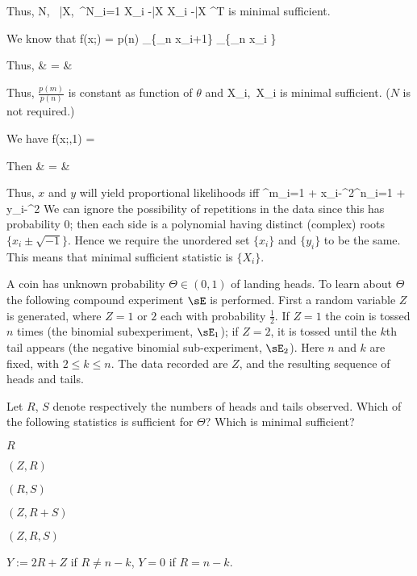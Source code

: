 Thus,
\be
\lob N, \ \bar{X},\ \sum^N_{i=1} \lob X_i -\bar{X} \rob \lob X_i -\bar{X} \rob^T\rob
\ee
is minimal sufficient.

\item [(c)] We know that
\be
f(x;\theta) = p(n) _{\{\max_n x_i\leq \theta+1\}} _{\{\min_n x_i \geq \theta\}}
\ee

Thus,
\beast
{} & = & \\
\eeast

Thus, $\frac{p(m)}{p(n)}$ is constant as function of $\theta$ and
\be
\lob \min X_i,\ \max X_i\rob
\ee
is minimal sufficient. ($N$ is not required.)

\item [(d)] We have
\be
f(x;\theta,1) = 
\ee

Then
\beast
{} & = & 
\eeast

Thus, $x$ and $y$ will yield proportional likelihoods iff
\be
\prod^m_{i=1} + \lob x_i-\theta\rob^2\rob \propto \prod^n_{i=1} + \lob y_i-\theta\rob^2\rob
\ee
We can ignore the possibility of repetitions in the data since this has probability 0; then each side is a polynomial having distinct (complex) roots $\{x_i\pm \sqrt{-1}\}$. Hence we require the unordered set $\{x_i\}$ and $\{y_i\}$ to be the same. This means that minimal sufficient statistic is $\{X_i\}$.

\een





\item A coin has unknown probability $\Theta\in (0, 1)$ of landing heads. To learn about $\Theta$ the following compound experiment $\sE$ is performed. First a random variable $Z$ is generated, where $Z = 1$ or $2$ each with probability $\frac 12$. If $Z = 1$ the coin is tossed $n$ times (the binomial subexperiment, $\sE_1$); if $Z = 2$, it is tossed until the $k$th tail appears (the negative binomial sub-experiment, $\sE_2$). Here $n$ and $k$ are fixed, with $2 \leq  k \leq  n$. The data recorded are $Z$, and the resulting sequence of heads and tails.

Let $R$, $S$ denote respectively the numbers of heads and tails observed. Which of the following statistics is sufficient for $\Theta$? Which is minimal sufficient?
\ben
\item [(a)] $R$
\item [(b)] $(Z,R)$
\item [(c)] $(R, S)$
\item [(d)] $(Z,R + S)$
\item [(e)] $(Z,R, S)$
\item [(f)] $Y:= 2R + Z$ if $R \neq n - k$, $Y = 0$ if $R = n - k$.
\een



